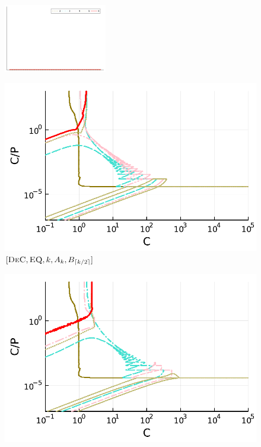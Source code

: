 \begin{figure}
	\centering
	\includegraphics[width=0.4\textwidth,trim={230 340 30 22}, clip]{pdf/pdepics/legends/colors_a-d_new_horiz_2-6_no_order.pdf}\\
	\begin{minipage}[t]{0.32\textwidth}
		\centering
		\includegraphics[width=\textwidth]{pdf/pdepics/disp/IMEXDeC_equispaced_disp_all_2-6_newE.pdf}
		\small$[\textsc{DeC}, \textsc{EQ},k,A_k,B_{\lceil k/2 \rceil}]$\par
	\end{minipage}
	\begin{minipage}[t]{0.32\textwidth}
		\centering
		\includegraphics[width=\textwidth]{pdf/pdepics/disp/IMEXDeC_subtimesteps_equispaced_disp_all_2-6_newE.pdf}

\end{minipage}
\end{figure}
